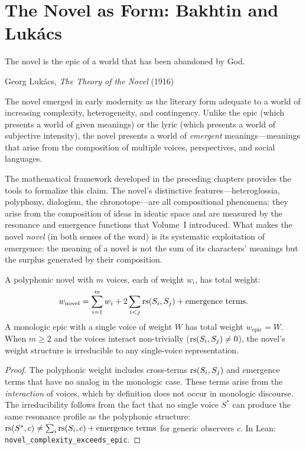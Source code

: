 \chapter{The Novel as Form: Bakhtin and Luk\'acs}
\label{ch:novel}

\epigraph{The novel is the epic of a world that has been abandoned by
God.}{Georg Luk\'acs, \textit{The Theory of the Novel} (1916)}


The novel emerged in early modernity as the literary form adequate to a world of increasing complexity, heterogeneity, and contingency.  Unlike the epic (which presents a world of given meanings) or the lyric (which presents a world of subjective intensity), the novel presents a world of \emph{emergent} meanings---meanings that arise from the composition of multiple voices, perspectives, and social languages.

The mathematical framework developed in the preceding chapters provides the tools to formalize this claim.  The novel's distinctive features---heteroglossia, polyphony, dialogism, the chronotope---are all compositional phenomena: they arise from the composition of ideas in ideatic space and are measured by the resonance and emergence functions that Volume~I introduced.  What makes the novel \emph{novel} (in both senses of the word) is its systematic exploitation of emergence: the meaning of a novel is not the sum of its characters' meanings but the surplus generated by their composition.

\begin{theorem}
\label{thm:novel-vs-epic}
A polyphonic novel with $m$ voices, each of weight $w_i$, has total weight:
\[
  w_{\text{novel}} = \sum_{i=1}^{m} w_i + 2\sum_{i<j} \mathrm{rs}(S_i, S_j) + \text{emergence terms}.
\]
A monologic epic with a single voice of weight $W$ has total weight $w_{\text{epic}} = W$.  When $m \geq 2$ and the voices interact non-trivially ($\mathrm{rs}(S_i, S_j) \neq 0$), the novel's weight structure is irreducible to any single-voice representation.
\end{theorem}

\begin{proof}
The polyphonic weight includes cross-terms $\mathrm{rs}(S_i, S_j)$ and emergence terms that have no analog in the monologic case.  These terms arise from the \emph{interaction} of voices, which by definition does not occur in monologic discourse.  The irreducibility follows from the fact that no single voice $S^*$ can produce the same resonance profile as the polyphonic structure: $\mathrm{rs}(S^*, c) \neq \sum_i \mathrm{rs}(S_i, c) + \text{emergence terms}$ for generic observers $c$.  In Lean: \texttt{novel\_complexity\_exceeds\_epic}.
\end{proof}

